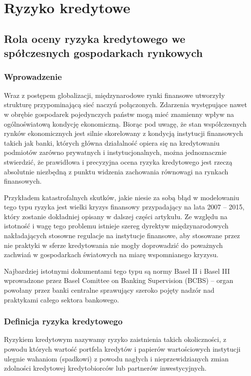 ﻿\chapter{Ryzyko kredytowe}

\section{Rola oceny ryzyka kredytowego we spółczesnych gospodarkach rynkowych}

\subsection{Wprowadzenie}

Wraz z postępem globalizacji, międzynarodowe rynki finansowe utworzyły strukturę przypominającą sieć naczyń połączonych. Zdarzenia występujące nawet w obrębie gospodarek pojedynczych państw mogą mieć znamienny wpływ na ogólnoświatową kondycję ekonomiczną. Biorąc pod uwagę, że stan współczesnych rynków ekonomicznych jest silnie skorelowany z kondycją instytucji finansowych takich jak banki, których główna działalność opiera się na kredytowaniu podmiotów zarówno prywatnych i instytucjonalnych, można jednoznacznie stwierdzić, że prawidłowa i precyzyjna ocena ryzyka kredytowego jest rzeczą absolutnie niezbędną z punktu widzenia zachowania równowagi na rynkach finansowych.

Przykładem katastrofalnych skutków, jakie niesie za sobą błąd w modelowaniu tego typu ryzyka jest wielki kryzys finansowy przypadający na lata 2007 – 2015, który zostanie dokładniej opisany w dalszej części artykułu. Ze względu na istotność i wagę tego problemu istnieje szereg dyrektyw międzynarodowych nakładających stosowne regulacje na instytucje finansowe, aby stosowane przez nie praktyki w sferze kredytowania nie mogły doprowadzić do poważnych zachwiań w gospodarkach światowych na miarę wspomnianego kryzysu.

Najbardziej istotnymi dokumentami tego typu są normy Basel II i Basel III wprowadzone przez Basel Comittee on Banking Supervision (BCBS) – organ powołany przez banki centralne sprawujący szeroko pojęty nadzór nad praktykami całego sektora bankowego.

\subsection{Definicja ryzyka kredytowego}

Ryzykiem kredytowym nazywamy ryzyko zaistnienia takich okoliczności, z powodu których wartość portfela kredytów i papierów wartościowych instytucji ulegnie wahaniom (spadkowi) z powodu nagłych i nieprzewidzianych zmian zdolności kredytowej kredytobiorców lub partnerów inwestycyjnych.

